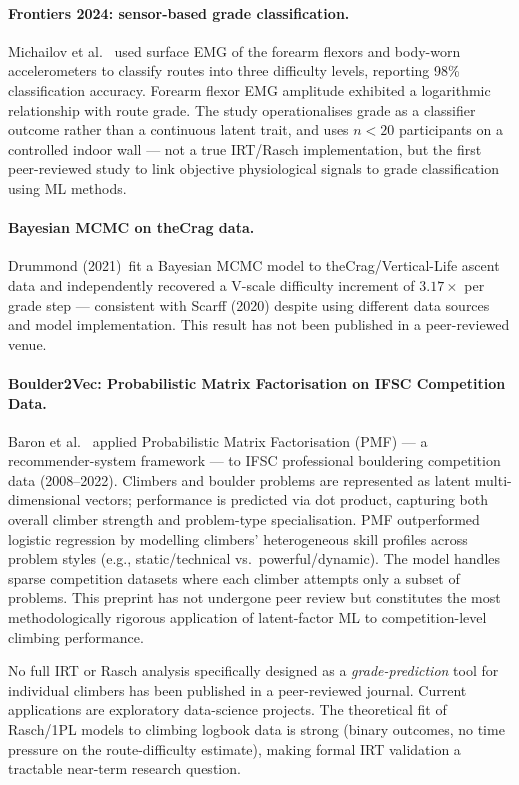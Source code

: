 \paragraph{Frontiers 2024: sensor-based grade classification.}
Michailov et al.\ \cite{OM25} used surface EMG of the forearm flexors and body-worn accelerometers to classify routes into three difficulty levels, reporting 98\% classification accuracy. Forearm flexor EMG amplitude exhibited a logarithmic relationship with route grade. The study operationalises grade as a classifier outcome rather than a continuous latent trait, and uses $n < 20$ participants on a controlled indoor wall --- not a true IRT/Rasch implementation, but the first peer-reviewed study to link objective physiological signals to grade classification using ML methods.

\paragraph{Bayesian MCMC on theCrag data.}
Drummond (2021)\singlesource\ fit a Bayesian MCMC model to theCrag/Vertical-Life ascent data and independently recovered a V-scale difficulty increment of $3.17\times$ per grade step --- consistent with Scarff (2020) despite using different data sources and model implementation. This result has not been published in a peer-reviewed venue.

\paragraph{Boulder2Vec: Probabilistic Matrix Factorisation on IFSC Competition Data.}
Baron et al.\ \cite{Baron2024Boulder2Vec} applied Probabilistic Matrix Factorisation (PMF) --- a recommender-system framework --- to IFSC professional bouldering competition data (2008--2022). Climbers and boulder problems are represented as latent multi-dimensional vectors; performance is predicted via dot product, capturing both overall climber strength and problem-type specialisation. PMF outperformed logistic regression by modelling climbers' heterogeneous skill profiles across problem styles (e.g., static/technical vs.\ powerful/dynamic). The model handles sparse competition datasets where each climber attempts only a subset of problems. This preprint has not undergone peer review but constitutes the most methodologically rigorous application of latent-factor ML to competition-level climbing performance.

\medskip
No full IRT or Rasch analysis specifically designed as a \emph{grade-prediction} tool for individual climbers has been published in a peer-reviewed journal. Current applications are exploratory data-science projects. The theoretical fit of Rasch/1PL models to climbing logbook data is strong (binary outcomes, no time pressure on the route-difficulty estimate), making formal IRT validation a tractable near-term research question.

